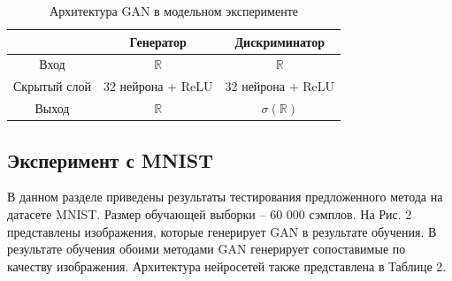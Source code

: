 \documentclass[preprint,12pt]{elsarticle}
\begin{document}
\begin{table}[h]
    \centering
    \begin{tabular}{|c|c|c|}
\hline 
 & Генератор & Дискриминатор \\ 
\hline 
Вход & $\mathbb{R}$ & $\mathbb{R}$ \\ 
\hline 
Скрытый слой & 32 нейрона + ReLU & 32 нейрона + ReLU \\ 
\hline 
Выход & $\mathbb{R}$  & $\sigma(\mathbb{R})$ \\ 
\hline 
\end{tabular}
    \caption{Архитектура GAN в модельном эксперименте}
    \label{tab:my_label}
\end{table}

\subsection{Эксперимент с MNIST}

В данном разделе приведены результаты тестирования предложенного метода на датасете MNIST. Размер обучающей выборки -- 60 000 сэмплов. На Рис. 2 представлены изображения, которые генерирует GAN в результате обучения.%
В результате обучения обоими методами GAN генерирует сопоставимые по качеству изображения.
Архитектура нейросетей также представлена в Таблице 2.
\end{document}
